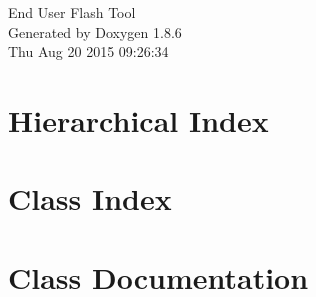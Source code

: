 \documentclass[twoside]{book}
\newcommand{\clearemptydoublepage}{%
  \newpage{\pagestyle{empty}\cleardoublepage}%
}
\begin{document}
\hypersetup{pageanchor=false}
\begin{titlepage}
\vspace*{7cm}
\begin{center}%
{\Large End User Flash Tool }\\
\vspace*{1cm}
{\large Generated by Doxygen 1.8.6}\\
\vspace*{0.5cm}
{\small Thu Aug 20 2015 09:26:34}\\
\end{center}
\end{titlepage}
\clearemptydoublepage
\tableofcontents
\clearemptydoublepage
{}
\hypersetup{pageanchor=true}

\chapter{Hierarchical Index}

\chapter{Class Index}

\chapter{Class Documentation}







































\newpage
{}
{}
\printindex
\end{document}
